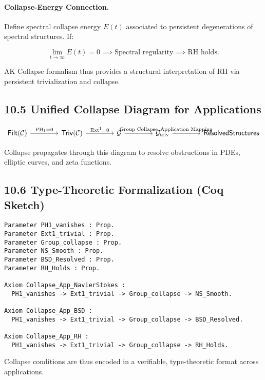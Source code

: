 \documentclass[11pt]{article}
\begin{document}
\paragraph{Collapse-Energy Connection.}
Define spectral collapse energy \( E(t) \) associated to persistent degenerations of spectral structures. If:

\[
\lim_{t \to \infty} E(t) = 0 \implies \text{Spectral regularity} \implies \text{RH holds}.
\]

AK Collapse formalism thus provides a structural interpretation of RH via persistent trivialization and collapse.

\subsection*{10.5 Unified Collapse Diagram for Applications}

\[
\begin{tikzcd}[column sep=4em]
\mathsf{Filt}(\mathcal{C}) \arrow[r, "\mathrm{PH}_1 = 0"]
& \mathsf{Triv}(\mathcal{C}) \arrow[r, "\mathrm{Ext}^1 = 0"]
& \mathcal{G} \arrow[r, "\text{Group Collapse}"]
& \mathcal{G}_{\mathrm{triv}} \arrow[r, "\text{Application Mapping}"]
& \mathsf{Resolved Structures}
\end{tikzcd}
\]

Collapse propagates through this diagram to resolve obstructions in PDEs, elliptic curves, and zeta functions.

\subsection*{10.6 Type-Theoretic Formalization (Coq Sketch)}

\begin{lstlisting}[language=Coq]
Parameter PH1_vanishes : Prop.
Parameter Ext1_trivial : Prop.
Parameter Group_collapse : Prop.
Parameter NS_Smooth : Prop.
Parameter BSD_Resolved : Prop.
Parameter RH_Holds : Prop.

Axiom Collapse_App_NavierStokes :
  PH1_vanishes -> Ext1_trivial -> Group_collapse -> NS_Smooth.

Axiom Collapse_App_BSD :
  PH1_vanishes -> Ext1_trivial -> Group_collapse -> BSD_Resolved.

Axiom Collapse_App_RH :
  PH1_vanishes -> Ext1_trivial -> Group_collapse -> RH_Holds.
\end{lstlisting}

Collapse conditions are thus encoded in a verifiable, type-theoretic format across applications.
\end{document}
